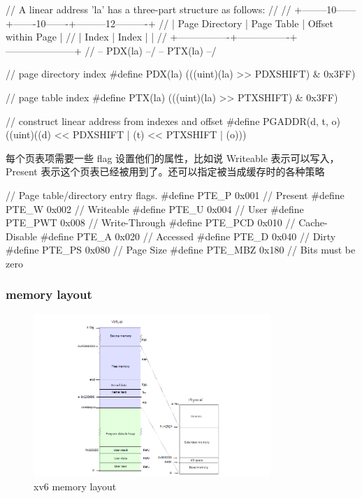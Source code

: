 
\begin{ccode}
    // A linear address 'la' has a three-part structure as follows:
    //
    // +--------10------+-------10-------+---------12----------+
    // | Page Directory |   Page Table   | Offset within Page  |
    // |      Index     |      Index     |                     |
    // +----------------+----------------+---------------------+
    //  \--- PDX(la) --/ \--- PTX(la) --/
        
    // page directory index
    #define PDX(la)		(((uint)(la) >> PDXSHIFT) & 0x3FF)
        
    // page table index
    #define PTX(la)		(((uint)(la) >> PTXSHIFT) & 0x3FF)
        
    // construct linear address from indexes and offset
    #define PGADDR(d, t, o)	((uint)((d) << PDXSHIFT | (t) << PTXSHIFT | (o)))
\end{ccode}

每个页表项需要一些 flag 设置他们的属性，比如说 Writeable 表示可以写入，Present 表示这个页表已经被用到了。还可以指定被当成缓存时的各种策略


\begin{ccode}
    // Page table/directory entry flags.
    #define PTE_P		0x001	// Present
    #define PTE_W		0x002	// Writeable
    #define PTE_U		0x004	// User
    #define PTE_PWT		0x008	// Write-Through
    #define PTE_PCD		0x010	// Cache-Disable
    #define PTE_A		0x020	// Accessed
    #define PTE_D		0x040	// Dirty
    #define PTE_PS		0x080	// Page Size
    #define PTE_MBZ		0x180	// Bits must be zero
\end{ccode}

\subsubsection{memory layout}

\begin{figure}[h]
    \centering
    \includegraphics[width=0.8\textwidth]{img/memlayout.PNG}
    \caption{xv6 memory layout}
    \label{fig:2}
\end{figure}


